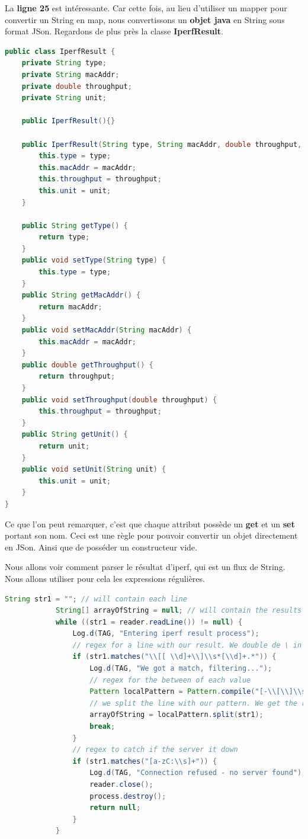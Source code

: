 La \textbf{ligne 25} est intéressante. Car cette fois, au lieu d'utiliser un mapper pour convertir un String en map, nous convertissons un \textbf{objet java} en String sous format JSon. Regardons de plus près la classe \textbf{IperfResult}.

\begin{lstlisting}[language=Java, caption={classe IperfResult}]
public class IperfResult {
	private String type;
	private String macAddr;
	private double throughput;
	private String unit;
	
	public IperfResult(){}
	
	public IperfResult(String type, String macAddr, double throughput, String unit){
		this.type = type;
		this.macAddr = macAddr;
		this.throughput = throughput;
		this.unit = unit;
	}
	
	public String getType() {
		return type;
	}
	public void setType(String type) {
		this.type = type;
	}
	public String getMacAddr() {
		return macAddr;
	}
	public void setMacAddr(String macAddr) {
		this.macAddr = macAddr;
	}
	public double getThroughput() {
		return throughput;
	}
	public void setThroughput(double throughput) {
		this.throughput = throughput;
	}
	public String getUnit() {
		return unit;
	}
	public void setUnit(String unit) {
		this.unit = unit;
	}
}
\end{lstlisting}
Ce que l'on peut remarquer, c'est que chaque attribut possède un \textbf{get} et un \textbf{set} portant son nom. Ceci est une règle pour pouvoir convertir un objet directement en JSon. Ainsi que de posséder un constructeur vide.

\medskip

Nous allons voir comment parser le résultat d'iperf, qui est un flux de String. Nous allons utiliser pour cela les expressions régulières.
\begin{lstlisting}[language=Java, caption={Parsing du résultat d'une commande Iperf}]
String str1 = ""; // will contain each line
			String[] arrayOfString = null; // will contain the results
			while ((str1 = reader.readLine()) != null) {
				Log.d(TAG, "Entering iperf result process");
				// regex for a line with our result. We double de \ in java
				if (str1.matches("\\[[ \\d]+\\]\\s*[\\d]+.*")) {
					Log.d(TAG, "We got a match, filtering...");
					// regex for the between of each value
					Pattern localPattern = Pattern.compile("[-\\[\\]\\s]+");
					// we split the line with our pattern. We get the results
					arrayOfString = localPattern.split(str1);
					break;
				}
				// regex to catch if the server it down
				if (str1.matches("[a-zC:\\s]+")) {
					Log.d(TAG, "Connection refused - no server found");
					reader.close();
					process.destroy();
					return null;
				}
			}
\end{lstlisting}

